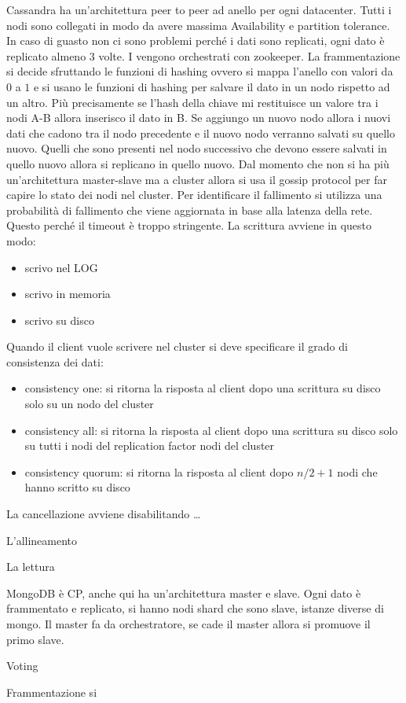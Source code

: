 Cassandra ha un'architettura peer to peer ad anello per ogni datacenter. Tutti i nodi sono collegati in modo da 
avere massima Availability e partition tolerance. In caso di guasto non ci sono 
problemi perché i dati sono replicati, ogni dato è replicato almeno 3 volte. I
vengono orchestrati con zookeeper. La frammentazione si decide sfruttando le funzioni
di hashing ovvero si mappa l'anello con valori da $0$ a $1$ e si usano le funzioni 
di hashing per salvare il dato in un nodo rispetto ad un altro. Più precisamente 
se l'hash della chiave mi restituisce un valore tra i nodi A-B allora inserisco il 
dato in B. Se aggiungo un nuovo nodo allora i nuovi dati che cadono tra il nodo 
precedente e il nuovo nodo verranno salvati su quello nuovo. Quelli che sono presenti 
nel nodo successivo che devono essere salvati in quello nuovo allora si replicano 
in quello nuovo. 
Dal momento che non si ha più un'architettura master-slave ma a cluster allora 
si usa il gossip protocol per far capire lo stato dei nodi nel cluster.
Per identificare il fallimento si utilizza una probabilità di fallimento che viene aggiornata 
in base alla latenza della rete. Questo perché il timeout è troppo stringente.
La scrittura avviene in questo modo:
\begin{itemize}
      \item scrivo nel LOG
      \item scrivo in memoria 
      \item scrivo su disco
\end{itemize}

Quando il client vuole scrivere nel cluster si deve specificare il grado di 
consistenza dei dati:
\begin{itemize}
      \item consistency one: si ritorna la risposta al client dopo una scrittura 
      su disco solo su un nodo del cluster
      \item consistency all: si ritorna la risposta al client dopo una scrittura 
      su disco solo su tutti i nodi del replication factor nodi del cluster
      \item consistency quorum: si ritorna la risposta al client dopo $n/2+1$ nodi che 
      hanno scritto su disco
\end{itemize}

La cancellazione avviene disabilitando \dots

L'allineamento

La lettura

MongoDB è CP, anche qui ha un'architettura master e slave. Ogni dato è frammentato
e replicato, si hanno nodi shard che sono slave, istanze diverse di mongo. Il master 
fa da orchestratore, se cade il master allora si promuove il primo slave. 

Voting

Frammentazione si 